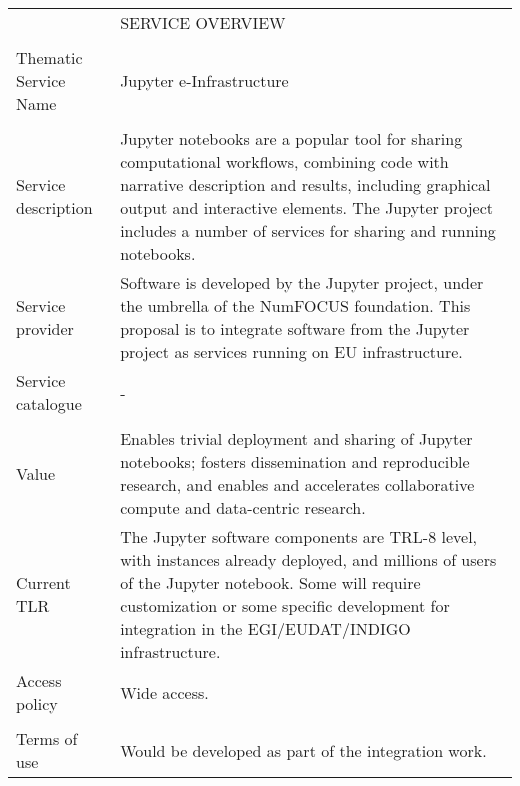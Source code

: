 \begin{tabular}{|p{5cm}|p{9cm}|}
\hline
 & SERVICE OVERVIEW\\
\\\hline
Thematic Service Name&Jupyter e-Infrastructure\\
\\\hline
Service description&Jupyter notebooks are a popular tool for sharing
computational workflows, combining code with narrative description and results,
including graphical output and interactive elements. The Jupyter project
includes a number of services for sharing and running notebooks.
\\\hline
Service provider&Software is developed by the Jupyter project, under the
umbrella of the NumFOCUS foundation. This proposal is to integrate software from
the Jupyter project as services running on EU infrastructure.
\\\hline
Service catalogue&-\\
\\\hline
Value&Enables trivial deployment and sharing of
Jupyter notebooks; fosters dissemination and reproducible research,
and enables and accelerates collaborative compute and data-centric research.
\\\hline
Current TLR&The Jupyter software components
are TRL-8 level, with instances already deployed, and millions of users of the
Jupyter notebook. Some will require
customization or some specific development for integration in the
EGI/EUDAT/INDIGO infrastructure.
\\\hline
Access policy&Wide access.\\
\\\hline
Terms of use&Would be developed as part of the integration work.
\\\hline
\end{tabular}
\newpage
